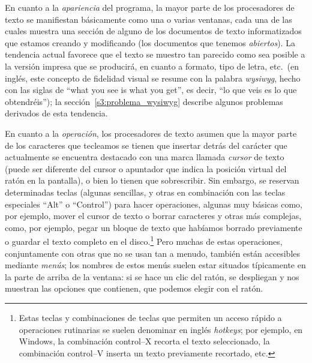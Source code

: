 En cuanto a la \emph{apariencia} del programa, la mayor parte de los procesadores de texto se manifiestan básicamente como una o varias ventanas, cada una de las cuales muestra una sección de alguno de los documentos de texto informatizados que estamos creando y modificando (los documentos que tenemos \emph{abiertos}). La tendencia actual favorece que el texto se muestro tan parecido como sea posible a la versión impresa que se  producirá, en cuanto a formato, tipo de letra, etc.\ (en inglés, este concepto de fidelidad visual se resume con la palabra {\em wysiwyg}, hecho con las siglas de ``what you see is what you get'', es decir, ``lo que veis es lo que obtendréis''); la sección~\ref{s3:problema_wysiwyg} describe algunos problemas derivados de esta tendencia. 

En cuanto a la \emph{operación}, los procesadores de texto asumen que la mayor parte de los caracteres que tecleamos se tienen que insertar detrás del carácter que actualmente se encuentra destacado con una marca llamada {\em cursor} de texto (puede ser diferente del cursor o apuntador que indica la posición virtual del ratón en la pantalla), o bien lo tienen que sobrescribir. Sin embargo, se reservan determinadas teclas (algunas sencillas, y otras en combinación con las teclas especiales ``Alt'' o ``Control'') para hacer operaciones, algunas muy básicas como, por ejemplo, mover el cursor de texto o borrar caracteres y otras más complejas, como, por ejemplo, pegar un bloque de texto que habíamos borrado previamente o guardar el texto completo en el disco.\footnote{Estas teclas y combinaciones de teclas que permiten un acceso rápido a operaciones rutinarias se suelen denominar en inglés \emph{hotkeys}; por ejemplo, en Windows, la combinación control--X recorta el texto seleccionado, la combinación control--V inserta un texto previamente recortado, etc.} Pero muchas de estas operaciones, conjuntamente con otras que no se usan tan a menudo, también están accesibles mediante \emph{menús}; los nombres de estos menús suelen estar situados típicamente en la parte de arriba de la ventana: si se  hace un clic del ratón, se despliegan y nos muestran las opciones que contienen, que podemos elegir con el ratón. 

